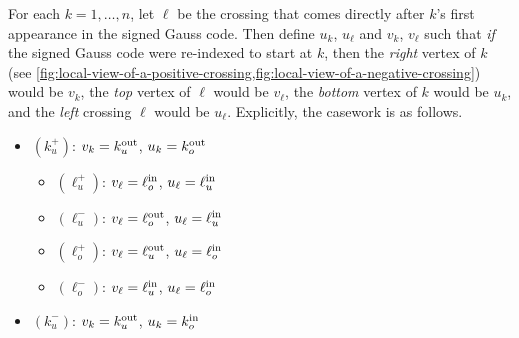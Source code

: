 \begin{definition}
\begin{enumerate}[label=(\arabic*)]
      For each $k = 1, \ldots, n$, let $\ell$ be the crossing that comes
      directly after $k$'s first appearance in the signed Gauss code.
      Then define $u_k$, $u_\ell$ and $v_k$, $v_\ell$ such that
      \emph{if} the signed Gauss code were re-indexed to start at $k$,
      then the \emph{right} vertex of $k$ (see
      \cref{fig:local-view-of-a-positive-crossing,fig:local-view-of-a-negative-crossing})
      would be $v_k$, the \emph{top} vertex of $\ell$ would be
      $v_\ell$, the \emph{bottom} vertex of $k$ would be $u_k$, and
      the \emph{left} crossing $\ell$ would be $u_\ell$. Explicitly,
      the casework is as follows.
      \begin{multicols}{2}
        \begin{itemize}
          \item \small $(k^+_u)$: \footnotesize $v_k = k^{\rm out}_u$,
            $u_k = k^{\rm out}_o$
            \begin{itemize}
              \item \small $(\ell_u^+)$: \footnotesize $v_\ell =
                \ell_o^{\rm in}$, $u_\ell = \ell_u^{\rm in}$
              \item \small $(\ell_u^-)$: \footnotesize $v_\ell =
                \ell_o^{\rm out}$, $u_\ell = \ell_u^{\rm in}$
              \item \small $(\ell_o^+)$: \footnotesize $v_\ell =
                \ell_u^{\rm out}$, $u_\ell = \ell_o^{\rm in}$
              \item \small $(\ell_o^-)$: \footnotesize $v_\ell =
                \ell_u^{\rm in}$, $u_\ell = \ell_o^{\rm in}$
            \end{itemize}
          \item \small $(k^-_u)$: \footnotesize $v_k = k^{\rm out}_u$,
            $u_k = k^{\rm in}_o$
\end{itemize}
\end{multicols}
\end{enumerate}
\end{definition}
